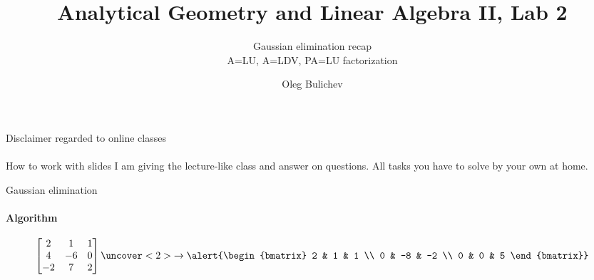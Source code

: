 \documentclass[aspectratio=169]{beamer}
\title[AGLA2]{Analytical Geometry and Linear Algebra II, Lab 2} %
\subtitle{Gaussian elimination recap\\
          A=LU, A=LDV, PA=LU factorization} %
\author{Oleg Bulichev}
\newcommand{\fbckg}[1]{\usebackgroundtemplate{\texttt{[image: \#1]}}}%
\begin{document}
\fbckg{fibeamer/figs/title_page.png}

\fbckg{fibeamer/figs/common.png}



\begin{frame}[c]{Disclaimer regarded to online classes}
\framesubtitle{}

\Large
\begin{block}{How to work with slides}
    \centering I am giving the lecture-like class and answer on questions. All tasks you have to solve by your own at home.
\end{block}
    
\end{frame}

\begin{frame}[t]{Gaussian elimination}
    \framesubtitle{Algorithm}
    \Large
    \begin{equation*}
        \begin{bmatrix}
            2  & 1  & 1 \\
            4  & -6 & 0 \\
            -2 & 7  & 2
        \end{bmatrix}
        \uncover<2>{\rightarrow \alert{\begin{bmatrix}
                    2 & 1  & 1  \\
                    0 & -8 & -2 \\
                    0 & 0  & 5
                \end{bmatrix}}}
    \end{equation*}
\end{frame}
\end{document}

